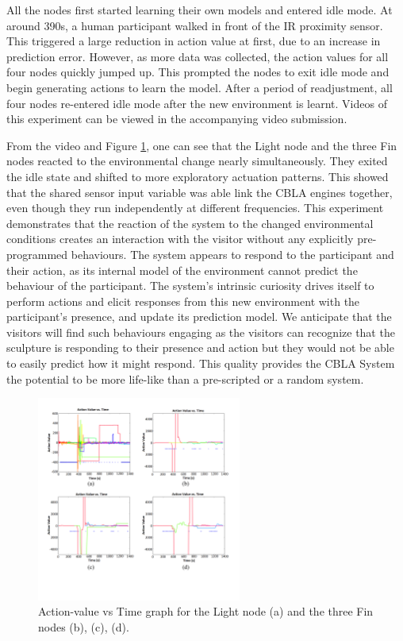 All the nodes first started learning their own models and entered idle mode. At around 390s, a human participant walked in front of the IR proximity sensor. This triggered a large reduction in action value at first, due to an increase in prediction error. However, as more data was collected, the action values for all four nodes quickly jumped up. This prompted the nodes to exit idle mode and begin generating actions to learn the model. After a period of readjustment, all four nodes re-entered idle mode after the new environment is learnt. Videos of this experiment can be viewed in the accompanying video submission.

From the video and Figure \ref{fig:Single_Cluster Action Value Vs Time}, one can see that the Light node and the three Fin nodes reacted to the environmental change nearly simultaneously. They exited the idle state and shifted to more exploratory actuation patterns. This showed that the shared sensor input variable was able link the CBLA engines together, even though they run independently at different frequencies. This experiment demonstrates that the reaction of the system to the changed environmental conditions creates an interaction with the visitor without any explicitly pre-programmed behaviours. The system appears to respond to the participant and their action, as its internal model of the environment cannot predict the behaviour of the participant. The system's intrinsic curiosity drives itself to perform actions and elicit responses from this new environment with the participant's presence, and update its prediction model. We anticipate that the visitors will find such behaviours engaging as the visitors can recognize that the sculpture is responding to their presence and action but they would not be able to easily predict how it might respond. This quality provides the CBLA System the potential to be more life-like than a pre-scripted or a random system. 

\begin{figure}
	\centering
	\includegraphics[width=0.6\textwidth]{"fig/validations/Single_Cluster Action Value Vs Time"}
	\caption[Action value vs time graph for the Single Cluster Experiment]{Action-value vs Time graph for the Light node (a) and the three Fin nodes (b), (c), (d).}
	\label{fig:Single_Cluster Action Value Vs Time}
\end{figure}


